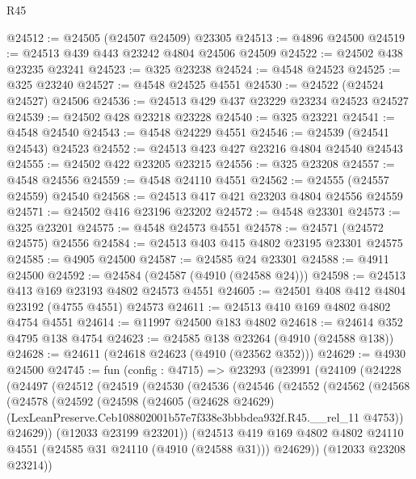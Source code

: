 \begin{lexlean}{R45}
\begin{coremodule}
@24512 := @24505 (@24507 @24509) @23305
@24513 := @4896 @24500
@24519 := @24513 @439 @443 @23242 @4804 @24506 @24509
@24522 := @24502 @438 @23235 @23241
@24523 := @325 @23238
@24524 := @4548 @24523
@24525 := @325 @23240
@24527 := @4548 @24525 @4551
@24530 := @24522 (@24524 @24527) @24506
@24536 := @24513 @429 @437 @23229 @23234 @24523 @24527
@24539 := @24502 @428 @23218 @23228
@24540 := @325 @23221
@24541 := @4548 @24540
@24543 := @4548 @24229 @4551
@24546 := @24539 (@24541 @24543) @24523
@24552 := @24513 @423 @427 @23216 @4804 @24540 @24543
@24555 := @24502 @422 @23205 @23215
@24556 := @325 @23208
@24557 := @4548 @24556
@24559 := @4548 @24110 @4551
@24562 := @24555 (@24557 @24559) @24540
@24568 := @24513 @417 @421 @23203 @4804 @24556 @24559
@24571 := @24502 @416 @23196 @23202
@24572 := @4548 @23301
@24573 := @325 @23201
@24575 := @4548 @24573 @4551
@24578 := @24571 (@24572 @24575) @24556
@24584 := @24513 @403 @415 @4802 @23195 @23301 @24575
@24585 := @4905 @24500
@24587 := @24585 @24 @23301
@24588 := @4911 @24500
@24592 := @24584 (@24587 (@4910 (@24588 @24)))
@24598 := @24513 @413 @169 @23193 @4802 @24573 @4551
@24605 := @24501 @408 @412 @4804 @23192 (@4755 @4551) @24573
@24611 := @24513 @410 @169 @4802 @4802 @4754 @4551
@24614 := @11997 @24500 @183 @4802
@24618 := @24614 @352 @4795 @138 @4754
@24623 := @24585 @138 @23264 (@4910 (@24588 @138))
@24628 := @24611 (@24618 @24623 (@4910 (@23562 @352)))
@24629 := @4930 @24500
@24745 := fun (config : @4715) =>
  @23293
    (@23991
      (@24109
        (@24228
          (@24497
            (@24512
              (@24519
                (@24530
                  (@24536
                    (@24546
                      (@24552
                        (@24562
                          (@24568
                            (@24578
                              (@24592
                                (@24598
                                  (@24605
                                    (@24628 @24629)
                                    (LexLeanPreserve.Ceb108802001b57e7f338e3bbbdea932f.R45.__rel_11
                                      @4753))
                                  @24629))
                              (@12033 @23199 @23201))
                            (@24513
                              @419
                              @169
                              @4802
                              @4802
                              @24110
                              @4551
                              (@24585 @31 @24110 (@4910 (@24588 @31)))
                              @24629))
                          (@12033 @23208 @23214))

\end{coremodule}
\end{lexlean}
